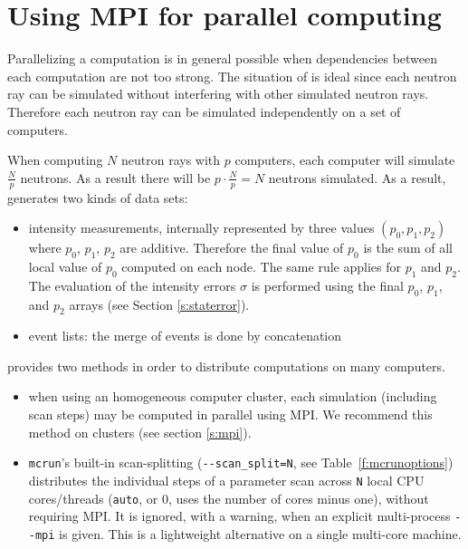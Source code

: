 \section{Using MPI for parallel computing}
\label{s:run-mpi}

Parallelizing a computation is in general possible when dependencies between
  each computation are not too strong. The situation of \MCS is
  ideal since each neutron ray can be simulated without interfering with
  other simulated neutron rays. Therefore each neutron ray can be simulated
  independently on a set of computers.

  When computing $N$ neutron rays with $p$ computers, each computer will
  simulate $\frac{N}{p}$ neutrons. As a result there will be $p \cdot
  \frac{N}{p} = N$ neutrons simulated. As a result, \MCS generates two kinds of
  data sets:
\begin{itemize}
\item intensity measurements, internally represented by three
  values $(p_0, p_1, p_2)$ where $p_0$, $p_1$, $p_2$ are
  additive. Therefore the final value of $p_0$ is the sum of all
  local value of  $p_0$ computed on each node. The same rule applies
  for $p_1$ and $p_2$. The evaluation of the intensity errors $\sigma$
  is performed using the final $p_0$, $p_1$, and $p_2$ arrays (see Section \ref{s:staterror}).
\item event lists: the merge of events is done by concatenation
\end{itemize}

\MCS provides two methods in order to distribute computations on many
computers.
\begin{itemize}
\item when using an homogeneous computer cluster, each simulation (including
  scan steps) may be computed in parallel using MPI. We recommend this method on
  clusters (see section \ref{s:mpi}).
\item \texttt{mcrun}'s built-in scan-splitting (\verb+--scan_split=N+, see
  Table~\ref{f:mcrunoptions}) distributes the individual steps of a parameter
  scan across \texttt{N} local CPU cores/threads (\texttt{auto}, or 0, uses the number of cores minus one), without requiring MPI. It is ignored, with a warning, when an explicit multi-process \verb+--mpi+ is given. This
  is a lightweight alternative on a single multi-core machine.
\end{itemize}

